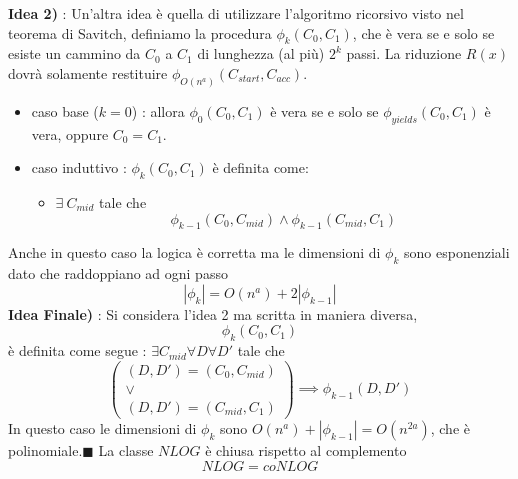 \documentclass[10pt, letterpaper]{report}
\begin{document}
\textbf{Idea 2)} : Un'altra idea è quella di utilizzare l'algoritmo ricorsivo visto nel teorema di Savitch, definiamo la procedura $\phi_k(C_0,C_1)$, che è vera se e solo se esiste un cammino da $C_0$ a $C_1$ di lunghezza (al più) $2^k$ passi. La riduzione $R(x)$ dovrà solamente restituire $\phi_{O(n^a)}(C_{start},C_{acc})$.\begin{itemize}
    \item caso base ($k=0$) : allora $\phi_0(C_0,C_1)$ è vera se e solo se $\phi_{yields}(C_0,C_1)$ è vera, oppure $C_0=C_1$. 
    \item caso induttivo : $\phi_k(C_0,C_1)$ è definita come:\begin{itemize}
        \item $\exists \ C_{mid}$ tale che $$\phi_{k-1}(C_0,C_{mid})\land \phi_{k-1}(C_{mid},C_1) $$ 
    \end{itemize}
\end{itemize}
Anche in questo caso la logica è corretta ma le dimensioni di $\phi_k$ sono esponenziali dato che raddoppiano ad ogni passo $$|\phi_k|=O(n^a)+2|\phi_{k-1}|$$\acc
\textbf{Idea Finale)} : Si considera l'idea 2 ma scritta in maniera diversa,  
$$\phi_k(C_0,C_1) $$ è definita come segue : $\exists C_{mid}\forall D\forall D'$ tale che 
$$ \begin{pmatrix}
    (D,D')=(C_0,C_{mid})\\ \lor \\ 
    (D,D')=(C_{mid},C_1)
\end{pmatrix}\implies \phi_{k-1}(D,D')$$
In questo caso le dimensioni di $\phi_k$ sono $O(n^a)+|\phi_{k-1}|=O(n^{2a})$, che è polinomiale.\hfill$\blacksquare$\acc 
{} La classe $NLOG$ è chiusa rispetto al complemento $$NLOG=coNLOG$$\dimo{}
\end{document}
